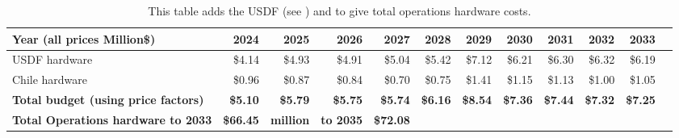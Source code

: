 \tiny \begin{longtable} { |p{}  |r  |r  |r  |r  |r  |r  |r  |r  |r  |r  |r |} 
\caption{This table adds the USDF (see ) and  to give total operations hardware costs. \label{tab:opsSummary}}\\ 
\hline 
\textbf{Year  (all prices Million\$)}&\textbf{2024}&\textbf{2025}&\textbf{2026}&\textbf{2027}&\textbf{2028}&\textbf{2029}&\textbf{2030}&\textbf{2031}&\textbf{2032}&\textbf{2033} \\ \hline
{USDF hardware}&{\$4.14}&{\$4.93}&{\$4.91}&{\$5.04}&{\$5.42}&{\$7.12}&{\$6.21}&{\$6.30}&{\$6.32}&{\$6.19} \\ \hline
{Chile hardware}&{\$0.96}&{\$0.87}&{\$0.84}&{\$0.70}&{\$0.75}&{\$1.41}&{\$1.15}&{\$1.13}&{\$1.00}&{\$1.05} \\ \hline
\textbf{Total budget (using price factors)}&\textbf{\$5.10}&\textbf{\$5.79}&\textbf{\$5.75}&\textbf{\$5.74}&\textbf{\$6.16}&\textbf{\$8.54}&\textbf{\$7.36}&\textbf{\$7.44}&\textbf{\$7.32}&\textbf{\$7.25} \\ \hline
\textbf{Total Operations hardware to 2033}&\textbf{\$66.45}&\textbf{million}&\textbf{to 2035}&\textbf{\$72.08}&&&&&& \\ \hline
\end{longtable} \normalsize
